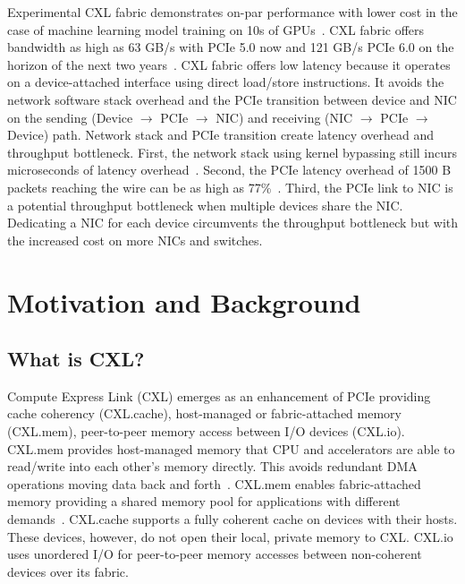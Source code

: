 Experimental CXL fabric demonstrates on-par performance with lower cost in the case of machine learning model training on 10s of GPUs~\cite{fabric-saving}. 
%
CXL fabric offers bandwidth as high as 63 GB/s with PCIe 5.0 now and 121 GB/s PCIe 6.0 on the horizon of the next two years~\cite{pcie-6-7}.
%
%
CXL fabric offers low latency because it operates on a device-attached interface using direct load/store instructions.
%
It avoids the network software stack overhead and the PCIe transition between device and NIC on the sending (Device $\rightarrow$ PCIe $\rightarrow$ NIC) and receiving (NIC $\rightarrow$ PCIe $\rightarrow$ Device) path.
%
Network stack and PCIe transition create latency overhead and throughput bottleneck.
%
First, the network stack using kernel bypassing still incurs microseconds of latency overhead~\cite{shinjuku:nsdi:2019, shenango:nsdi:2019, eRPC:nsdi:2019,snap:sosp:2019}.
%
Second, the PCIe latency overhead of 1500 B packets reaching the wire can be as high as 77\%~\cite{pcie-bench:sigcomm:2018}.
%
Third, the PCIe link to NIC is a potential throughput bottleneck when multiple devices share the NIC.
%
Dedicating a NIC for each device circumvents the throughput bottleneck but with the increased cost on more NICs and switches.

\section{Motivation and Background}
\label{aurelia:sec:motivation}

\subsection{What is CXL?}
Compute Express Link (CXL) emerges as an enhancement of PCIe providing cache coherency (CXL.cache), host-managed or fabric-attached memory (CXL.mem), peer-to-peer memory access between I/O devices (CXL.io).
%
CXL.mem provides host-managed memory that CPU and accelerators are able to read/write into each other's memory directly. This avoids redundant DMA operations moving data back and forth~\cite{fulcrum:hpca:2020, beacon:micro:2022, intel-cxl:ieee-micro:2023}.
%
CXL.mem enables fabric-attached memory providing a shared memory pool for applications with different demands~\cite{cxl-ssd:hotstorage:2022, directcxl:atc:2022, pond:asplos:2023}.
%
CXL.cache supports a fully coherent cache on devices with their hosts. These devices, however, do not open their local, private memory to CXL. 
%
CXL.io uses unordered I/O for peer-to-peer memory accesses between non-coherent devices over its fabric.
%

